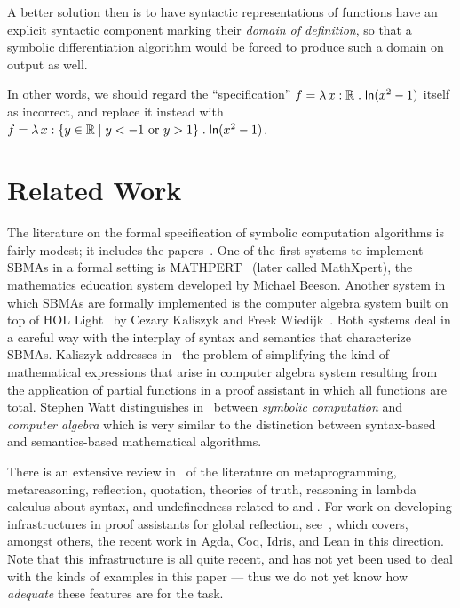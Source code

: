 \documentclass[fleqn]{llncs}
\newcommand{\RR}{\ensuremath{\mathbb{R}}}
\begin{document}
A better solution then is to have syntactic representations of functions have
an explicit syntactic component marking their \emph{domain of definition},
so that a symbolic differentiation algorithm would be forced to produce
such a domain on output as well.

In other words, we should regard the ``specification''
$f = \LambdaApp x : \RR \mdot \mname{ln}(x^2 - 1)$ itself as incorrect,
and replace it instead with
$f = \LambdaApp x : \set{y \in \RR \mid y < -1 \text{ or } y > 1}
\mdot \mname{ln}(x^2 - 1)$.

\section{Related Work}\label{sec:related-work}

The literature on the formal specification of symbolic computation
algorithms is fairly modest; it includes the
papers~\cite{DunstanEtAl98,Khan14,KhanSchreiner12,LimongelliTemperini92}.
One of the first systems to implement SBMAs in a formal setting is
MATHPERT~\cite{Beeson89} (later called MathXpert), the mathematics
education system developed by Michael Beeson.  Another system in which
SBMAs are formally implemented is the computer algebra system built on
top of HOL Light~\cite{Harrison09} by Cezary Kaliszyk and Freek
Wiedijk~\cite{KaliszykWiedijk07}.  Both systems deal in a careful way
with the interplay of syntax and semantics that characterize SBMAs.
Kaliszyk addresses in~\cite{Kaliszyk08} the problem of simplifying the
kind of mathematical expressions that arise in computer algebra system
resulting from the application of partial functions in a proof
assistant in which all functions are total.  Stephen Watt
distinguishes in~\cite{Watt06} between \emph{symbolic computation} and
\emph{computer algebra} which is very similar to the distinction
between syntax-based and semantics-based mathematical algorithms.

\bsp There is an extensive review in~\cite{Farmer18} of the literature
on metaprogramming, metareasoning, reflection, quotation, theories of
truth, reasoning in lambda calculus about syntax, and undefinedness
related to {\churchqe} and {\churchuqe}.  For work on developing
infrastructures in proof assistants for global reflection,
see~\cite{AnandEtAl18,BoyerMoore81,BuchbergerEtAl06,Christiansen:2014,ebner2017metaprogramming,MelhamEtAl13,VanDerWaltSwierstra12},
which covers, amongst others, the recent work in Agda, Coq, Idris, and
Lean in this direction. Note that this infrastructure is all quite
recent, and has not yet been used to deal with the kinds of examples
in this paper --- thus we do not yet know how \emph{adequate} these
features are for the task.  \esp
\end{document}
